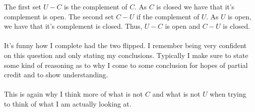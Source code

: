 \documentclass[10pt]{article}
\begin{document}
The first set $ U-C $ is the complement of $ C $. As $ C $ is closed we have that it's complement is open. The second set $ C-U $ if the complement of $ U $. As $ U $ is open, we have that it's complement is closed. Thus, $ U-C $ is open and $ C-U $ is closed.\\
\\
It's funny how I complete had the two flipped. I remember being very confident on this question and only stating my conclusions. Typically I make sure to state some kind of reasoning as to why I come to some conclusion for hopes of partial credit and to show understanding.\\
\\
This is again why I think more of what is not $ C $ and what is not $ U $ when trying to think of what I am actually looking at.

\newpage
\end{document}
